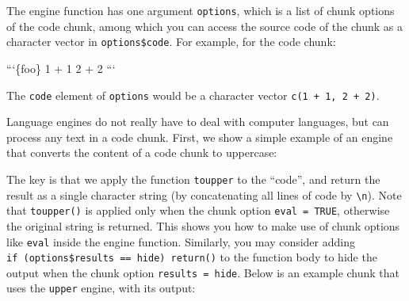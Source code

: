 \documentclass[
  11pt,
]{krantz}
\newenvironment{Shaded}{\begin{snugshade}}{\end{snugshade}}
\newcommand{\BaseNTok}[1]{\textcolor[rgb]{0.06,0.06,0.06}{#1}}
\newcommand{\CharTok}[1]{\textcolor[rgb]{0.5,0.5,0.5}{#1}}
\newcommand{\ControlFlowTok}[1]{\textcolor[rgb]{0.27,0.27,0.27}{\textbf{#1}}}
\newcommand{\DataTypeTok}[1]{\textcolor[rgb]{0.27,0.27,0.27}{#1}}
\newcommand{\KeywordTok}[1]{\textcolor[rgb]{0.27,0.27,0.27}{\textbf{#1}}}
\newcommand{\NormalTok}[1]{#1}
\newcommand{\OperatorTok}[1]{\textcolor[rgb]{0.43,0.43,0.43}{\textbf{#1}}}
\newcommand{\StringTok}[1]{\textcolor[rgb]{0.5,0.5,0.5}{#1}}
\begin{document}
The engine function has one argument \texttt{options}, which is a list of chunk options of the code chunk, among which you can access the source code of the chunk as a character vector in \texttt{options\$code}. For example, for the code chunk:

\begin{Shaded}
\begin{Highlighting}[]
\BaseNTok{```\{foo\}}
\BaseNTok{1 + 1}
\BaseNTok{2 + 2}
\BaseNTok{```}
\end{Highlighting}
\end{Shaded}

The \texttt{code} element of \texttt{options} would be a character vector \texttt{c(\textquotesingle{}1\ +\ 1\textquotesingle{},\ \textquotesingle{}2\ +\ 2\textquotesingle{})}.

Language engines do not really have to deal with computer languages, but can process any text in a code chunk. First, we show a simple example of an engine that converts the content of a code chunk to uppercase:

\begin{Shaded}
\end{Shaded}

The key is that we apply the function \texttt{toupper} to the ``code'', and return the result as a single character string (by concatenating all lines of code by \texttt{\textbackslash{}n}). Note that \texttt{toupper()} is applied only when the chunk option \texttt{eval\ =\ TRUE}, otherwise the original string is returned. This shows you how to make use of chunk options like \texttt{eval} inside the engine function. Similarly, you may consider adding \texttt{if\ (options\$results\ ==\ \textquotesingle{}hide\textquotesingle{})\ return()} to the function body to hide the output when the chunk option \texttt{results\ =\ \textquotesingle{}hide\textquotesingle{}}. Below is an example chunk that uses the \texttt{upper} engine, with its output:
\end{document}
